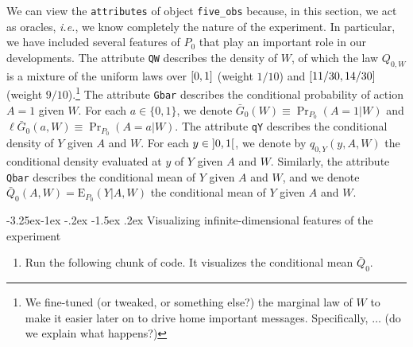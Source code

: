 \documentclass[]{article}
\makeatletter
\providecommand{\tightlist}{%
  \setlength{\itemsep}{0pt}\setlength{\parskip}{0pt}}
\let\rmarkdownfootnote\footnote%
\def\footnote{\protect\rmarkdownfootnote}
\renewcommand\subsection{\@startsection{subsection}{3}{\z@}%
                                     {-3.25ex\@plus -1ex \@minus -.2ex}%
                                     {-1.5ex \@plus .2ex}%
                                     {\normalfont\normalsize\bfseries}}
\newcommand{\gear}{\usebox{\gearbox}\;}
\newcommand{\Exp}{\textrm{E}}
\newcommand{\Gbar}{\bar{G}}
\newcommand{\Qbar}{\bar{Q}}
\theoremstyle{definition}
\theoremstyle{definition}
\theoremstyle{definition}
\theoremstyle{remark}
\makeatother
\begin{document}
We can view the \texttt{attributes} of object \texttt{five\_obs}
because, in this section, we act as oracles, \textit{i.e.}, we know
completely the nature of the experiment. In particular, we have included
several features of \(P_0\) that play an important role in our
developments. The attribute \texttt{QW} describes the density of \(W\),
of which the law \(Q_{0,W}\) is a mixture of the uniform laws over
\(\interval{0}{1}\) (weight \(1/10\)) and \(\interval{11/30}{14/30}\)
(weight
\(9/10\)).\footnote{We fine-tuned (or tweaked, or something else?)  the marginal
law  of $W$  to make  it easier  later on  to drive  home important  messages.
Specifically, $\ldots{}$ (do we explain  what happens?)} The attribute
\texttt{Gbar} describes the conditional probability of action \(A = 1\)
given \(W\). For each \(a \in \{0,1\}\), we denote
\(\Gbar_0(W) \equiv \Pr_{P_0}(A = 1 | W)\) and
\(\ell\Gbar_0(a,W) \equiv \Pr_{P_0}(A = a | W)\). The attribute
\texttt{qY} describes the conditional density of \(Y\) given \(A\) and
\(W\). For each \(y\in \interval[open]{0}{1}\), we denote by
\(q_{0,Y}(y, A, W)\) the conditional density evaluated at \(y\) of \(Y\)
given \(A\) and \(W\). Similarly, the attribute \texttt{Qbar} describes
the conditional mean of \(Y\) given \(A\) and \(W\), and we denote
\(\Qbar_0(A,W) = \Exp_{P_{0}}(Y|A,W)\) the conditional mean of \(Y\)
given \(A\) and \(W\).

\subsection{\gear Visualizing infinite-dimensional features of the experiment}
\label{subsec:visualizing}

\begin{enumerate}
\def\labelenumi{\arabic{enumi}.}
\tightlist
\item
  Run the following chunk of code. It visualizes the conditional mean
  \(\Qbar_{0}\).
\end{enumerate}
\end{document}
